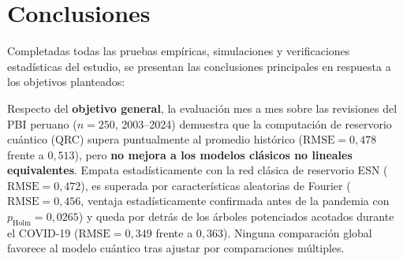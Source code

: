 \section{Conclusiones}

Completadas todas las pruebas empíricas, simulaciones y verificaciones estadísticas del estudio, se presentan las conclusiones principales en respuesta a los objetivos planteados:

Respecto del \textbf{objetivo general}, la evaluación mes a mes sobre las revisiones del PBI peruano (\(n=250\), 2003--2024) demuestra que la computación de reservorio cuántico (QRC) supera puntualmente al promedio histórico (\(\text{RMSE}=0{,}478\) frente a \(0{,}513\)), pero \textbf{no mejora a los modelos clásicos no lineales equivalentes}. Empata estadísticamente con la red clásica de reservorio ESN (\(\text{RMSE}=0{,}472\)), es superada por características aleatorias de Fourier (\(\text{RMSE}=0{,}456\), ventaja estadísticamente confirmada antes de la pandemia con \(p_{\text{Holm}}=0{,}0265\)) y queda por detrás de los árboles potenciados acotados durante el COVID-19 (\(\text{RMSE}=0{,}349\) frente a \(0{,}363\)). Ninguna comparación global favorece al modelo cuántico tras ajustar por comparaciones múltiples.

